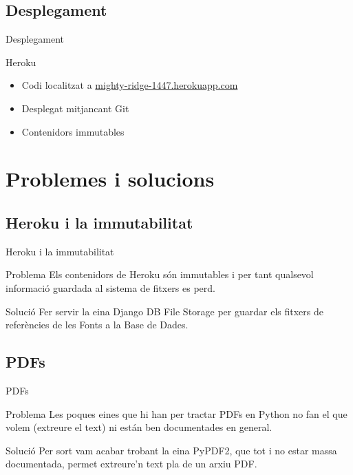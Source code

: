 \documentclass{beamer}
\begin{document}
\subsection{Desplegament}

\begin{frame}{Desplegament}
    \begin{block}{Heroku}
        \begin{itemize}
            \item Codi localitzat a \url{mighty-ridge-1447.herokuapp.com}
            \item Desplegat mitjancant Git
            \item Contenidors immutables
        \end{itemize}
    \end{block}
\end{frame}

\section{Problemes i solucions}

\subsection{Heroku i la immutabilitat}

\begin{frame}{Heroku i la immutabilitat}
    \begin{alertblock}{Problema}
        Els contenidors de Heroku són immutables i per tant qualsevol informació guardada al sistema de fitxers es perd.
    \end{alertblock}
    \pause{}
    \begin{exampleblock}{Solució}
        Fer servir la eina Django DB File Storage per guardar els fitxers de referències de les Fonts a la Base de Dades.
    \end{exampleblock}
\end{frame}

\subsection{PDFs}

\begin{frame}{PDFs}
    \begin{alertblock}{Problema}
        Les poques eines que hi han per tractar PDFs en Python no fan el que volem (extreure el text) ni están ben documentades en general.
    \end{alertblock}
    \pause{}
    \begin{exampleblock}{Solució}
        Per sort vam acabar trobant la eina PyPDF2, que tot i no estar massa documentada, permet extreure'n text pla de un arxiu PDF\@.
    \end{exampleblock}
\end{frame}
\end{document}
